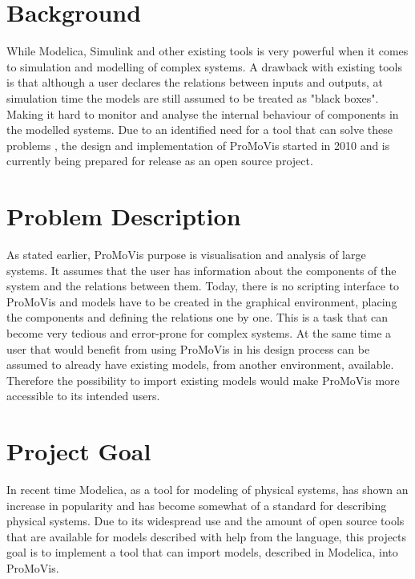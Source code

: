 \section{Background}
While Modelica, Simulink and other existing tools is very powerful when it comes to simulation and modelling of complex systems. A drawback with existing tools is that although a user declares the relations between inputs and outputs, at simulation time the models are still assumed to be treated as "black boxes". Making it hard to monitor and analyse the internal behaviour of components in the modelled systems. Due to an identified need for a tool that can solve these problems \cite{ProMoVisPaper}\nocite{*}, the design and implementation of ProMoVis started in 2010 and is currently being prepared for release as an open source project.
\section{Problem Description}
As stated earlier, ProMoVis purpose is visualisation and analysis of large systems. It assumes that the user has information about the components of the system and the relations between them. Today, there is no scripting interface to ProMoVis and models have to be created in the graphical environment, placing the components and defining the relations one by one. This is a task that can become very tedious and error-prone for complex systems. At the same time a user that would benefit from using ProMoVis in his design process can be assumed to already have existing models, from another environment, available. Therefore the possibility to import existing models would make ProMoVis more accessible to its intended users.
\section{Project Goal}
In recent time Modelica, as a tool for modeling of physical systems, has shown an increase in popularity and has become somewhat of a standard for describing physical systems. Due to its widespread use and the amount of open source tools that are available for models described with help from the language, this projects goal is to implement a tool that can import models, described in Modelica, into ProMoVis.





